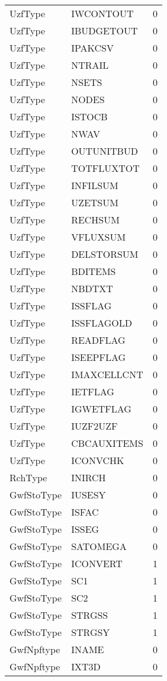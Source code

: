 \begin{longtable}{p{6cm} p{4cm} p{2cm} }
UzfType &  IWCONTOUT & 0 \\ 
UzfType &  IBUDGETOUT & 0 \\ 
UzfType &  IPAKCSV & 0 \\ 
UzfType &  NTRAIL & 0 \\ 
UzfType &  NSETS & 0 \\ 
UzfType &  NODES & 0 \\ 
UzfType &  ISTOCB & 0 \\ 
UzfType &  NWAV & 0 \\ 
UzfType &  OUTUNITBUD & 0 \\ 
UzfType &  TOTFLUXTOT & 0 \\ 
UzfType &  INFILSUM & 0 \\ 
UzfType &  UZETSUM & 0 \\ 
UzfType &  RECHSUM & 0 \\ 
UzfType &  VFLUXSUM & 0 \\ 
UzfType &  DELSTORSUM & 0 \\ 
UzfType &  BDITEMS & 0 \\ 
UzfType &  NBDTXT & 0 \\ 
UzfType &  ISSFLAG & 0 \\ 
UzfType &  ISSFLAGOLD & 0 \\ 
UzfType &  READFLAG & 0 \\ 
UzfType &  ISEEPFLAG & 0 \\ 
UzfType &  IMAXCELLCNT & 0 \\ 
UzfType &  IETFLAG & 0 \\ 
UzfType &  IGWETFLAG & 0 \\ 
UzfType &  IUZF2UZF & 0 \\ 
UzfType &  CBCAUXITEMS & 0 \\ 
UzfType &  ICONVCHK & 0 \\ 
RchType &  INIRCH & 0 \\ 
GwfStoType &  IUSESY & 0 \\ 
GwfStoType &  ISFAC & 0 \\ 
GwfStoType &  ISSEG & 0 \\ 
GwfStoType &  SATOMEGA & 0 \\ 
GwfStoType &  ICONVERT & 1 \\ 
GwfStoType &  SC1 & 1 \\ 
GwfStoType &  SC2 & 1 \\ 
GwfStoType &  STRGSS & 1 \\ 
GwfStoType &  STRGSY & 1 \\ 
GwfNpftype &  INAME & 0 \\ 
GwfNpftype &  IXT3D & 0 \\ 

\end{longtable}
